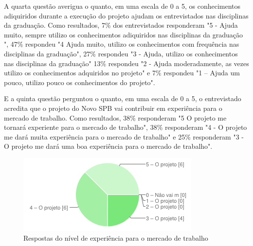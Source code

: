
A quarta questão averigua o quanto, em uma escala de 0 a 5, os conhecimentos adiquiridos durante a execução do projeto ajudam os entrevistados nas disciplinas da graduação. Como resultados, 7\% dos entrevistados responderam "5 - Ajuda muito, sempre utilizo os conhecimentos adiquiridos nas disciplinas da graduação	", 47\% respondeu "4  Ajuda muito, utilizo os conhecimentos com frequência nas disciplinas da graduação", 27\% respondeu "3 - Ajuda, utilizo os conhecimentos nas disciplinas da graduação" 13\% respondeu "2 - Ajuda moderadamente, as vezes utilizo os conhecimentos adquiridos no projeto" e 7\% respondeu "1 – Ajuda um pouco, utilizo pouco os conhecimentos do projeto".


E a quinta questão perguntou o quanto, em uma escala de 0 a 5, o entrevistado acredita que o projeto do Novo SPB vai contribuir em experiência para o mercado de trabalho. Como resultados, 38\% responderam "5  O projeto me tornará experiente para o mercado de trabalho", 38\% responderam "4 - O projeto me dará muita experiência para o mercado de trabalho" e 25\% responderam "3 - O projeto me dará uma boa experiência para o mercado de trabalho".

\begin{figure}[htpb]
  \begin{center}
    \includegraphics[width=.37\textwidth]{images/chart4.png}
  \end{center}
  \caption{Respostas do nível de experiência para o mercado de trabalho}
  \label{fig:core_concurrent}
\end{figure} 

